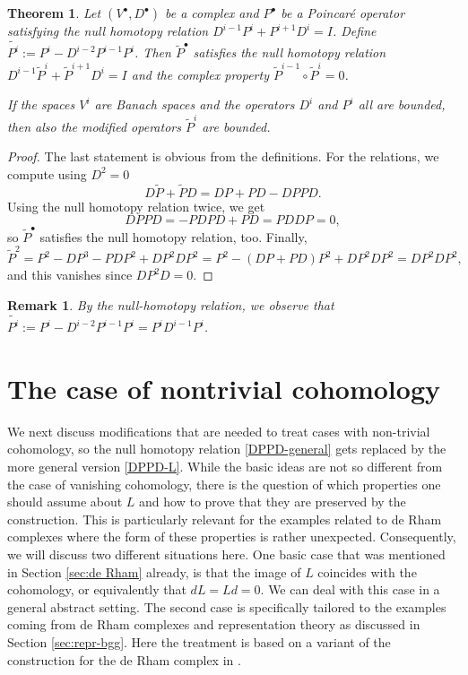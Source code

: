 \documentclass[11pt]{amsart}
\newtheorem{theorem}{Theorem}
\newtheorem{remark}{Remark}
\newcommand{\0}{\mathaccent23}
\newcommand{\bs}{{\scriptscriptstyle \bullet}}
\begin{document}
   \begin{theorem}\label{thm:complex}
     Let $(V^{\bs}, D^{\bs})$ be a complex and $P^{\bs}$ be a Poincar\'e operator satisfying the null homotopy relation $D^{i-1}P^{i}+P^{i+1}D^{i}=I$. Define $\tilde{  P^i}:=  P^i-   {D^{i-2}} P^{i-1}P^i$. Then $\tilde P^\bs$ satisfies the null homotopy relation  $D^{i-1}\tilde{P}^i+\tilde{P}^{i+1} D^i=I$ and the complex property $\tilde P^{i-1}\circ \tilde P^i=0$.

     If the spaces $V^i$ are Banach spaces and the operators $D^i$ and $P^i$ all are bounded, then also the modified operators $\tilde P^i$ are bounded. 
   \end{theorem} 
   \begin{proof}
     The last statement is obvious from the definitions. For the relations, we compute using $D^2=0$ 
{ 
$$
  D\tilde P+\tilde PD = DP+PD-DPPD.
$$}
Using the null homotopy relation twice, we get
{ 
$$
 DPPD=-PDPD+PD=PDDP=0,
 $$}
 so $\tilde P^\bs$ satisfies the null homotopy relation, too. Finally, 
$$
 \tilde P^2= P^{2}- D P^{3}- P D P^{2}+ D P^{2}D P^{2}= P^{2}-( D P+ P D) P^{2}+
 D P^{2} D P^{2}= D P^{2} D P^{2}, 
$$
and this vanishes since $ D P^{2} D=0$.
\end{proof}
{ 
\begin{remark}
By the null-homotopy relation, we observe that $\tilde{  P^i}:=  P^i-{D^{i-2}} P^{i-1}P^i={P^{i}} D^{i-1}P^i$.
\end{remark}
}





\section{The case of nontrivial cohomology}\label{sec:modifications}
We next discuss modifications that are needed to treat cases with non-trivial cohomology, so the null homotopy relation \eqref{DPPD-general} gets replaced by the more general version \eqref{DPPD-L}. While the basic ideas are not so different from the case of vanishing cohomology, there is the question of which properties one should assume about $L$ and how to prove that they are preserved by the construction. This is particularly relevant for the examples related to de Rham complexes where the form of these properties is rather unexpected. Consequently, we will discuss two different situations here. One basic case that was mentioned in Section \ref{sec:de Rham} already, is that the image of $L$ coincides with the cohomology, or equivalently that $dL=Ld=0$. We can deal with this case in a general abstract setting. The second case is specifically tailored to the examples coming from de Rham complexes and representation theory as discussed in Section \ref{sec:repr-bgg}. Here the treatment is based on a variant of the construction for the de Rham complex in \cite{costabel2010bogovskiui}.
\end{document}
